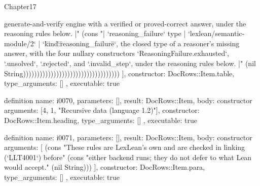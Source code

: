 \begin{lexlean}{Chapter17}
\begin{semanticmodule}
{{generate-and-verify engine with a verified or proved-correct answer, under the reasoning rules below. |" (cons "| `reasoning_failure` type | `lexlean/semantic-module/2` | `{\"kind\":\"reasoning_failure\"}`, the closed type of a reasoner's missing answer, with the four nullary constructors `ReasoningFailure.exhausted`, `.unsolved`, `.rejected`, and `.invalid_step`, under the reasoning rules below. |" (nil String)))))))))))))))))))))))))))))))))))
    ],
    constructor: DocRows::Item.table,
    type_arguments: []
  },
  executable: true
}

definition{
  name: i0070,
  parameters: [],
  result: DocRows::Item,
  body: constructor{
    arguments: [4, 1, "Recursive data (language 1.2)"],
    constructor: DocRows::Item.heading,
    type_arguments: []
  },
  executable: true
}

definition{
  name: i0071,
  parameters: [],
  result: DocRows::Item,
  body: constructor{
    arguments: [
      (cons "These rules are LexLean's own and are checked in linking (`LLT4001`) before" (cons "either backend runs; they do not defer to what Lean would accept." (nil String)))
    ],
    constructor: DocRows::Item.para,
    type_arguments: []
  },
  executable: true
}


\end{semanticmodule}
\end{lexlean}
